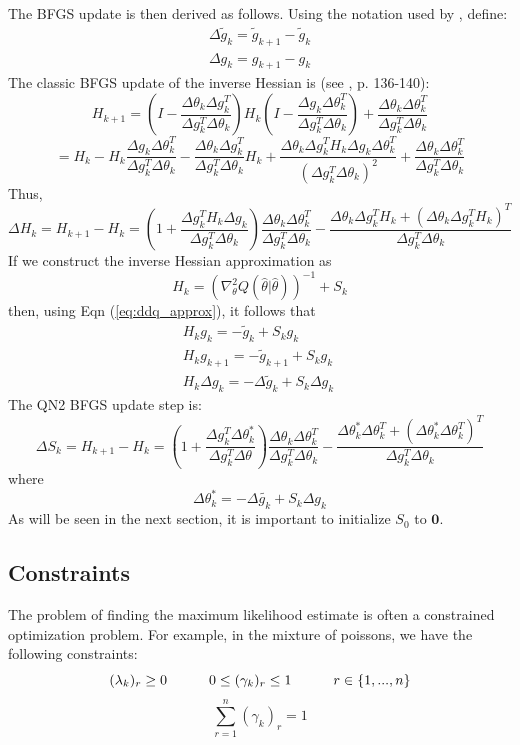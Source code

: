 \documentclass[letter,12pt]{article}
\begin{document}
The BFGS update is then derived as follows.  Using the notation used by \cite{jamshidianj97}, define:
\[
\begin{array}{l}
\Delta \tilde{g}_k = \tilde{g}_{k+1} - \tilde{g}_{k} \\
\Delta g_k = g_{k+1} - g_k
\end{array}
\]
The classic BFGS update of the inverse Hessian is (see \cite{nocedalwright_BFGS}, p. 136-140):
\[
H_{k+1} = (I - \frac{\Delta \theta_k\Delta g_k^T}{\Delta g_k^T\Delta \theta_k})H_k(I-\frac{\Delta g_k\Delta \theta_k^T}{\Delta g_k^T\Delta \theta_k})+\frac{\Delta \theta_k\Delta \theta_k^T}{\Delta g_k^T\Delta \theta_k}
\]
\[
= H_k - H_k\frac{\Delta g_k\Delta \theta_k^T}{\Delta g_k^T\Delta \theta_k} - \frac{\Delta \theta_k\Delta g_k^T}{\Delta g_k^T\Delta \theta_k}H_k + \frac{\Delta \theta_k\Delta g_k^TH_k\Delta g_k\Delta \theta_k^T}{(\Delta g_k^T\Delta \theta_k)^2}+\frac{\Delta \theta_k\Delta \theta_k^T}{\Delta g_k^T\Delta \theta_k}
\]
Thus,
\[
\Delta H_k = H_{k+1} - H_k
= (1+\frac{\Delta g_k^TH_k\Delta g_k}{\Delta g_k^T\Delta \theta_k})\frac{\Delta \theta_k\Delta \theta_k^T}{\Delta g_k^T\Delta \theta_k} - \frac{\Delta \theta_k\Delta g_k^TH_k + (\Delta \theta_k\Delta g_k^TH_k)^T}{\Delta g_k^T\Delta \theta_k}
\]
If we construct the inverse Hessian approximation as
\[
H_k = (\nabla^2_{\theta}Q(\hat{\theta}|\hat{\theta}))^{-1} + S_k
\]
then, using Eqn (\ref{eq:ddq_approx}), it follows that
\[\begin{array}{c}
H_k  g_k =  -\tilde{g}_k + S_kg_k
\\
H_k  g_{k+1} = -\tilde{g}_{k+1} + S_kg_k
\\
H_k \Delta g_k = -\Delta \tilde{g}_k + S_k\Delta g_k
\end{array}\
\]
The QN2 BFGS update step is:
\begin{equation} \label{eq:BFGS}
\Delta S_k = H_{k+1} - H_k =
\left(
1 + \frac{\Delta g_k^T \Delta \theta_k^*}{\Delta g_k^T \Delta \theta}
\right)
\frac{\Delta \theta_k \Delta \theta_k^T}{\Delta g_k^T \Delta \theta_k}
-
\frac{\Delta \theta_k^* \Delta \theta_k^T + (\Delta \theta_k^* \Delta \theta_k^T)^T}{\Delta g_k^T \Delta \theta_k}
\end{equation}
where
\[
\Delta \theta_k^* = -\Delta \tilde{g_k} + S_k \Delta g_k
\]
As will be seen in the next section, it is important to initialize $S_0$ to $\boldsymbol{0}$.

\subsection{Constraints}
The problem of finding the maximum likelihood estimate is often a constrained optimization problem.  For example, in the mixture of poissons, we have the following constraints:
\[
(\lambda_k)_r \geq 0 \indent \indent
0 \leq (\gamma_k)_r \leq 1 \indent \indent
r \in \{1,...,n\}
\]
\begin{equation} \label{eqn:equalityconstraint}
\sum_{r=1}^{n} (\gamma_k)_r = 1
\end{equation}
\end{document}
